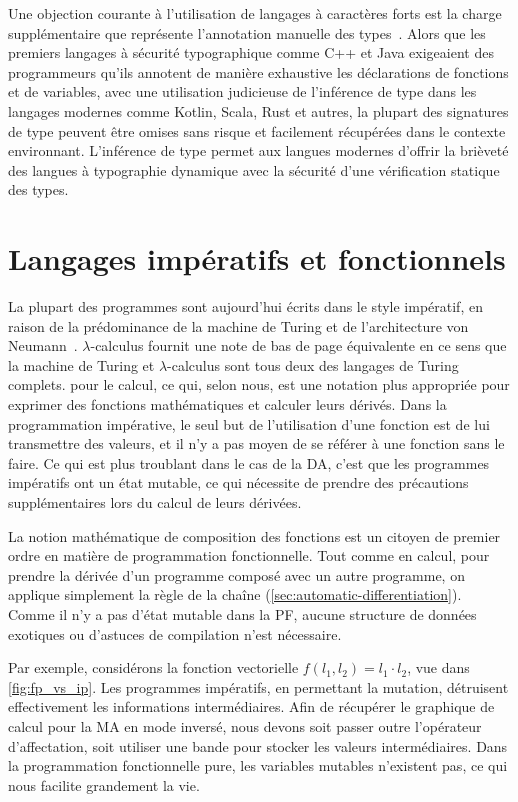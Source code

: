 Une objection courante à l'utilisation de langages à caractères forts est la charge supplémentaire que représente l'annotation manuelle des types~\citep{ore2018assessing}. Alors que les premiers langages à sécurité typographique comme C++ et Java exigeaient des programmeurs qu'ils annotent de manière exhaustive les déclarations de fonctions et de variables, avec une utilisation judicieuse de l'inférence de type dans les langages modernes comme Kotlin, Scala, Rust et autres, la plupart des signatures de type peuvent être omises sans risque et facilement récupérées dans le contexte environnant. L'inférence de type permet aux langues modernes d'offrir la brièveté des langues à typographie dynamique avec la sécurité d'une vérification statique des types.

\section{Langages impératifs et fonctionnels}

La plupart des programmes sont aujourd'hui écrits dans le style impératif, en raison de la prédominance de la machine de Turing et de l'architecture von Neumann~\citep{backus2007can}. $\lambda$-calculus fournit une note de bas de page équivalente {en ce sens que la machine de Turing et $\lambda$-calculus sont tous deux des langages de Turing complets.} pour le calcul, ce qui, selon nous, est une notation plus appropriée pour exprimer des fonctions mathématiques et calculer leurs dérivés. Dans la programmation impérative, le seul but de l'utilisation d'une fonction est de lui transmettre des valeurs, et il n'y a pas moyen de se référer à une fonction sans le faire. Ce qui est plus troublant dans le cas de la DA, c'est que les programmes impératifs ont un état mutable, ce qui nécessite de prendre des précautions supplémentaires lors du calcul de leurs dérivées.

La notion mathématique de composition des fonctions est un citoyen de premier ordre en matière de programmation fonctionnelle. Tout comme en calcul, pour prendre la dérivée d'un programme composé avec un autre programme, on applique simplement la règle de la chaîne (\autoref{sec:automatic-differentiation}). Comme il n'y a pas d'état mutable dans la PF, aucune structure de données exotiques ou d'astuces de compilation n'est nécessaire.

Par exemple, considérons la fonction vectorielle $f(l_1, l_2) = l_1 \cdot l_2$, vue dans \autoref{fig:fp_vs_ip}. Les programmes impératifs, en permettant la mutation, détruisent effectivement les informations intermédiaires. Afin de récupérer le graphique de calcul pour la MA en mode inversé, nous devons soit passer outre l'opérateur d'affectation, soit utiliser une bande pour stocker les valeurs intermédiaires. Dans la programmation fonctionnelle pure, les variables mutables n'existent pas, ce qui nous facilite grandement la vie.

